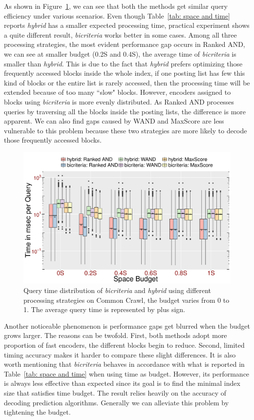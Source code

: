 \documentclass{sig-alternate-05-2015}
\begin{document}
As shown in Figure~\ref{fig: query}, we can see that both the methods get similar query efficiency under various scenarios.
Even though Table~\ref{tab: space and time} reports \textit{hybrid} has a smaller expected processing time, practical experiment shows a quite different result, \textit{bicriteria} works better in some cases.
Among all three processing strategies, the most evident performance gap occurs in Ranked AND, we can see at smaller budget (0.2S and 0.4S), the average time of \textit{bicriteria} is smaller than \textit{hybrid}.
This is due to the fact that \textit{hybrid} prefers optimizing those frequently accessed blocks inside the whole index, if one posting list has few this kind of blocks or the entire list is rarely accessed, then the processing time will be extended because of too many ``slow" blocks.
However, encoders assigned to blocks using \textit{bicriteria} is more evenly distributed. 
As Ranked AND processes queries by traversing all the blocks inside the posting lists, the difference is more apparent.
We can also find gaps caused by WAND and MaxScore are less vulnerable to this problem because these two strategies are more likely to decode those frequently accessed blocks.
\begin{figure}
	\centering
	\includegraphics[width=1.0\linewidth]{query}
	\caption{Query time distribution of \textit{bicriteria} and \textit{hybrid} using different processing strategies on Common Crawl, the budget varies from 0 to 1. The average query time is represented by plus sign.}
	\label{fig: query}
\end{figure}

Another noticeable phenomenon is performance gaps get blurred when the budget grows larger.
The reasons can be twofold.
First, both methods adopt more proportion of fast encoders, the different blocks begin to reduce.
Second, limited timing accuracy makes it harder to compare these slight differences.
It is also worth mentioning that \textit{bicriteria} behaves in accordance with what is reported in Table~\ref{tab: space and time} when using time as budget.
However, its performance is always less effective than expected since its goal is to find the minimal index size that satisfies time budget.
The result relies heavily on the accuracy of decoding prediction algorithms.
Generally we can alleviate this problem by tightening the budget.
\end{document}
